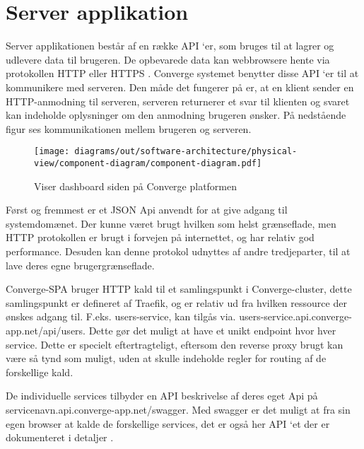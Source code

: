 \section{Server applikation}

Server applikationen består af en række API ‘er, som bruges til at lagrer og udlevere data til brugeren. De opbevarede data kan webbrowsere hente via protokollen HTTP eller HTTPS \cite[HTTP]{converge-terms} . Converge systemet benytter disse API ‘er til at kommunikere med serveren. Den måde det fungerer på er, at en klient sender en HTTP-anmodning til serveren, serveren returnerer et svar til klienten og svaret kan indeholde oplysninger om den anmodning brugeren ønsker. På nedstående figur ses kommunikationen mellem brugeren og serveren.

\begin{figure}[H]
    \centering
  \texttt{[image: diagrams/out/software-architecture/physical-view/component-diagram/component-diagram.pdf]}
  \caption{Viser dashboard siden på Converge platformen}
  \label{fig:dashboard}
  \end{figure}

Først og fremmest er et JSON Api anvendt for at give adgang til systemdomænet. Der kunne været brugt hvilken som helst grænseflade, men HTTP protokollen er brugt i forvejen på internettet, og har relativ god performance. Desuden kan denne protokol udnyttes af andre tredjeparter, til at lave deres egne brugergrænseflade.

Converge-SPA bruger HTTP kald til et samlingspunkt i Converge-cluster, dette samlingspunkt er defineret af Traefik, og er relativ ud fra hvilken ressource der ønskes adgang til. F.eks. users-service, kan tilgås via. users-service.api.converge-app.net/api/users. Dette gør det muligt at have et unikt endpoint hvor hver service. Dette er specielt eftertragteligt, eftersom den reverse proxy brugt kan være så tynd som muligt, uden at skulle indeholde regler for routing af de forskellige kald.

De individuelle services tilbyder en API beskrivelse af deres eget Api på servicenavn.api.converge-app.net/swagger. Med swagger er det muligt at fra sin egen browser at kalde de forskellige services, det er også her API ‘et der er dokumenteret i detaljer \cite{swagger}.